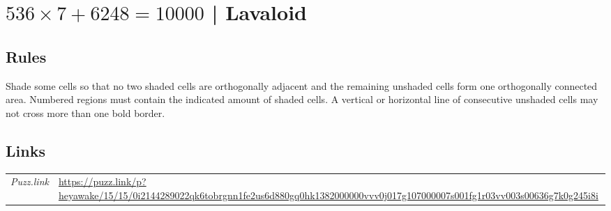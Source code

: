 \section[$536 \times 7 + 6248 = 10000$ | Lavaloid {[\emph{Heyawake}]}]{$536 \times 7 + 6248 = 10000$ | {\normalfont Lavaloid}}
\label{sec:08-536-times-7-6248-10000-lavaloid}

\subsection*{Rules}
\begin{markdown}
Shade some cells so that no two shaded cells are orthogonally adjacent and the remaining unshaded cells form one orthogonally connected area. Numbered regions must contain the indicated amount of shaded cells. A vertical or horizontal line of consecutive unshaded cells may not cross more than one bold border.
\end{markdown}
\subsection*{Links}
\begin{tabularx}{\textwidth}{l X}
\emph{Puzz.link} & \url{https://puzz.link/p?heyawake/15/15/0i2144289022qk6tobrgnn1fe2us6d880gq0hk1382000000vvv0j017g107000007s001fg1r03vv003s00636g7k0g245i8i} \\
\end{tabularx}
\pagebreak
